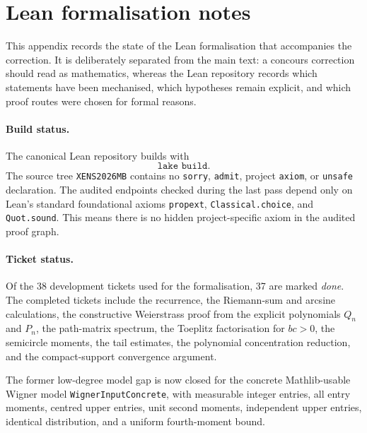 \documentclass[11pt,a4paper]{article}
\begin{document}
\appendix
\section{Lean formalisation notes}

This appendix records the state of the Lean formalisation that accompanies the
correction.  It is deliberately separated from the main text: a concours
correction should read as mathematics, whereas the Lean repository records
which statements have been mechanised, which hypotheses remain explicit, and
which proof routes were chosen for formal reasons.

\paragraph{Build status.}
The canonical Lean repository builds with
\[
  \texttt{lake build}.
\]
The source tree \texttt{XENS2026MB} contains no \texttt{sorry},
\texttt{admit}, project \texttt{axiom}, or \texttt{unsafe} declaration.  The
audited endpoints checked during the last pass depend only on Lean's standard
foundational axioms \texttt{propext}, \texttt{Classical.choice}, and
\texttt{Quot.sound}.  This means there is no hidden project-specific axiom in
the audited proof graph.

\paragraph{Ticket status.}
Of the 38 development tickets used for the formalisation, 37 are marked
\emph{done}.  The completed tickets include the recurrence, the Riemann-sum and
arcsine calculations, the constructive Weierstrass proof from the explicit
polynomials $Q_n$ and $P_n$, the path-matrix spectrum, the Toeplitz
factorisation for $bc>0$, the semicircle moments, the tail estimates, the
polynomial concentration reduction, and the compact-support convergence
argument.

The former low-degree model gap is now closed for the concrete Mathlib-usable
Wigner model \texttt{WignerInputConcrete}, with measurable integer entries, all
entry moments, centred upper entries, unit second moments, independent upper
entries, identical distribution, and a uniform fourth-moment bound.
\end{document}
